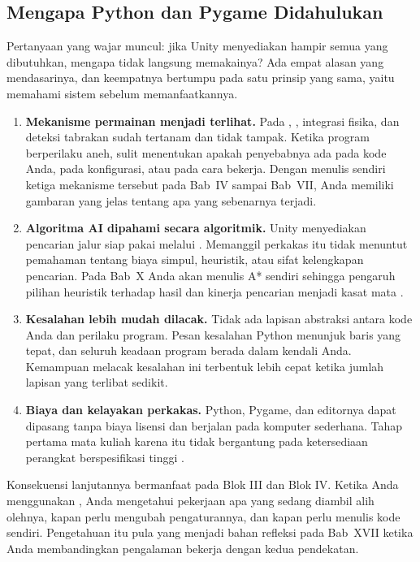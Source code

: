 \subsection{Mengapa Python dan Pygame Didahulukan}

Pertanyaan yang wajar muncul: jika Unity menyediakan hampir semua yang
dibutuhkan, mengapa tidak langsung memakainya? Ada empat alasan yang
mendasarinya, dan keempatnya bertumpu pada satu prinsip yang sama, yaitu
memahami sistem sebelum memanfaatkannya.

\begin{enumerate}
  \item \textbf{Mekanisme permainan menjadi terlihat.} Pada ,
        , integrasi fisika, dan deteksi tabrakan sudah
        tertanam dan tidak tampak. Ketika program berperilaku aneh, sulit
        menentukan apakah penyebabnya ada pada kode Anda, pada konfigurasi,
        atau pada cara  bekerja. Dengan menulis sendiri
        ketiga mekanisme tersebut pada Bab~IV sampai Bab~VII, Anda memiliki
        gambaran yang jelas tentang apa yang sebenarnya terjadi.
  \item \textbf{Algoritma AI dipahami secara algoritmik.} Unity menyediakan
        pencarian jalur siap pakai melalui . Memanggil
        perkakas itu tidak menuntut pemahaman tentang biaya simpul, heuristik,
        atau sifat kelengkapan pencarian. Pada Bab~X Anda akan menulis A*
        sendiri sehingga pengaruh pilihan heuristik terhadap hasil dan
        kinerja pencarian menjadi kasat mata \cite{santos-pathfinding}.
  \item \textbf{Kesalahan lebih mudah dilacak.} Tidak ada lapisan abstraksi
        antara kode Anda dan perilaku program. Pesan kesalahan Python menunjuk
        baris yang tepat, dan seluruh keadaan program berada dalam kendali
        Anda. Kemampuan melacak kesalahan ini terbentuk lebih cepat ketika
        jumlah lapisan yang terlibat sedikit.
  \item \textbf{Biaya dan kelayakan perkakas.} Python, Pygame, dan editornya
        dapat dipasang tanpa biaya lisensi dan berjalan pada komputer
        sederhana. Tahap pertama mata kuliah karena itu tidak bergantung pada
        ketersediaan perangkat berspesifikasi tinggi \cite{sweigart-invent}.
\end{enumerate}

Konsekuensi lanjutannya bermanfaat pada Blok III dan Blok IV. Ketika Anda
menggunakan , Anda mengetahui pekerjaan apa yang sedang
diambil alih olehnya, kapan perlu mengubah pengaturannya, dan kapan perlu
menulis kode sendiri. Pengetahuan itu pula yang menjadi bahan refleksi pada
Bab~XVII ketika Anda membandingkan pengalaman bekerja dengan kedua
pendekatan.

